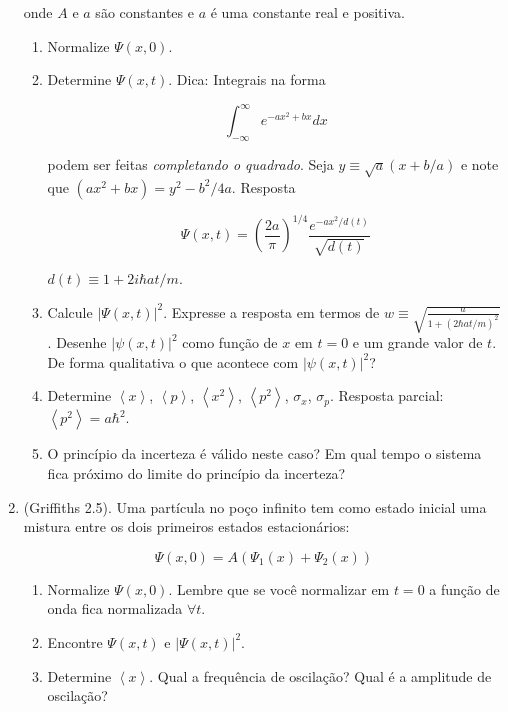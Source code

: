\documentclass[a4paper, 12pt, notitlepage]{article}
\begin{document}
\begin{enumerate}
  \noindent onde $A$ e $a$ são constantes e $a$ é uma constante real e positiva.
  
  \begin{enumerate}
    \item Normalize $\Psi(x, 0)$.
    \item Determine $\Psi(x, t)$. Dica: Integrais na forma
    
    \begin{equation*}
    \int_{-\infty}^{\infty}e^{-ax^2 + bx}dx
    \end{equation*}
    
    \noindent podem ser feitas \textit{completando o quadrado}. Seja $y \equiv \sqrt{a}(x + b/a)$ e note que $(ax^2 + bx) = y^2 - b^2/4a$. Resposta
    
    \begin{equation*}
    \Psi(x,t) = \left(\frac{2a}{\pi}\right)^{1/4} \frac{e^{-ax^2/d(t)}}{\sqrt{d(t)}}
    \end{equation*}
    
    \noindent $d(t) \equiv 1 + 2i\hbar at/m$.
    
    \item Calcule $|\Psi(x, t)|^2$.
    Expresse a resposta em termos de $w \equiv \sqrt{\frac{a}{1 + \left(2\hbar at/m\right)^2}}$.
    Desenhe $|\psi(x,t)|^2$ como função de $x$ em $t=0$ e um grande valor de $t$. De forma qualitativa o que acontece com $|\psi(x,t)|^2$?
    \item Determine $\left\langle x \right\rangle$, $\left\langle p \right\rangle$, $\left\langle x^2 \right\rangle$, $\left\langle p^2 \right\rangle$, $\sigma_x$, $\sigma_p$.
    Resposta parcial: $\left\langle p^2 \right\rangle = a\hbar^2$.
    \item O princípio da incerteza é válido neste caso? Em qual tempo o sistema fica próximo do limite do princípio da incerteza?
  \end{enumerate}


\item (Griffiths 2.5).\newline
  Uma partícula no poço infinito tem como estado inicial uma mistura entre os dois primeiros estados estacionários:
  
  \begin{equation*}
  \Psi(x,0) = A\left(\Psi_1(x) + \Psi_2(x)\right)
  \end{equation*}
  
  \begin{enumerate}
    \item Normalize $\Psi(x,0)$. Lembre que se você normalizar em $t=0$ a função de onda fica normalizada $\forall t$.
    \item Encontre $\Psi(x,t)$ e $|\Psi(x,t)|^2$.
    \item Determine $\left\langle x \right\rangle$. Qual a frequência de oscilação? Qual é a amplitude de oscilação?
  \end{enumerate}
 

\end{enumerate}
\end{document}
